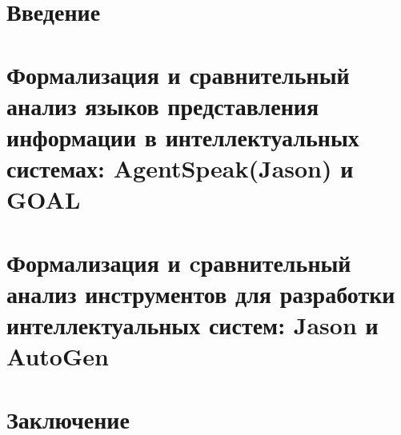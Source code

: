 \section*{Введение}


\newpage
\section{Формализация и сравнительный анализ языков представления информации в интеллектуальных системах: AgentSpeak(Jason) и GOAL}


\newpage
\section{Формализация и cравнительный анализ инструментов для разработки интеллектуальных систем: Jason и AutoGen}


\newpage
\section*{Заключение}
